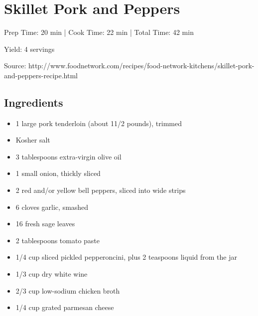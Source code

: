 \section{Skillet Pork and Peppers}

\begin{center}
Prep Time: 20 min |
Cook Time: 22 min |
Total Time: 42 min

\noindent Yield: 4 servings

\vspace{1em}

Source: http://www.foodnetwork.com/recipes/food-network-kitchens/skillet-pork-and-peppers-recipe.html
\end{center}

\subsection{Ingredients}
\begin{multicols}{2}
\begin{itemize}
    \item 1 large pork tenderloin (about 11/2 pounds), trimmed
    \item Kosher salt
    \item 3 tablespoons extra-virgin olive oil
    \item 1 small onion, thickly sliced
    \item 2 red and/or yellow bell peppers, sliced into wide strips
    \item 6 cloves garlic, smashed
    \item 16 fresh sage leaves
    \item 2 tablespoons tomato paste
    \item 1/4 cup sliced pickled pepperoncini, plus 2 teaspoons liquid from the jar
    \item 1/3 cup dry white wine
    \item 2/3 cup low-sodium chicken broth
    \item 1/4 cup grated parmesan cheese
\end{itemize}
\end{multicols}

